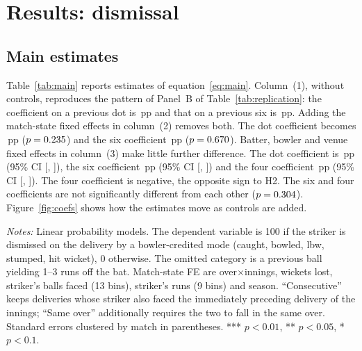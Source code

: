 \documentclass[11pt]{article}
\newcommand{\pp}{\,pp}
\begin{document}
\section{Results: dismissal}\label{sec:results}

\subsection{Main estimates}

Table~\ref{tab:main} reports estimates of equation~\eqref{eq:main}. Column~(1), without controls, reproduces the pattern of Panel~B of Table~\ref{tab:replication}: the coefficient on a previous dot is \RawDot\pp{} and that on a previous six is \RawSix\pp{}. Adding the match-state fixed effects in column~(2) removes both. The dot coefficient becomes \StateDot\pp{} ($p=0.235$) and the six coefficient \StateSix\pp{} ($p=0.670$). Batter, bowler and venue fixed effects in column~(3) make little further difference. The dot coefficient is \FullDot\pp{} (95\% CI [\FullDotLo, \FullDotHi]), the six coefficient \FullSix\pp{} (95\% CI [\FullSixLo, \FullSixHi]) and the four coefficient \FullFour\pp{} (95\% CI [\FullFourLo, \FullFourHi]). The four coefficient is negative, the opposite sign to H2. The six and four coefficients are not significantly different from each other ($p=0.304$). Figure~\ref{fig:coefs} shows how the estimates move as controls are added.

\begin{table}[tbp]
\centering
\begin{threeparttable}
\caption{Dismissal and the striker's previous ball}\label{tab:main}
\small

\begin{tablenotes}[flushleft]\footnotesize
\item \emph{Notes:} Linear probability models. The dependent variable is 100 if the striker is dismissed on the delivery by a bowler-credited mode (caught, bowled, lbw, stumped, hit wicket), 0 otherwise. The omitted category is a previous ball yielding 1--3 runs off the bat. Match-state FE are over$\times$innings, wickets lost, striker's balls faced (13 bins), striker's runs (9 bins) and season. ``Consecutive'' keeps deliveries whose striker also faced the immediately preceding delivery of the innings; ``Same over'' additionally requires the two to fall in the same over. Standard errors clustered by match in parentheses. *** $p<0.01$, ** $p<0.05$, * $p<0.1$.
\end{tablenotes}
\end{threeparttable}
\end{table}
\end{document}
